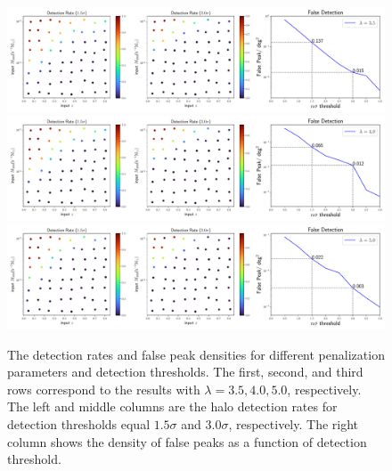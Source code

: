 \begin{figure}
 \centering
 \includegraphics[width=1.0\textwidth]{detfalse_threshold_NFW_lbd35.pdf}
 \includegraphics[width=1.0\textwidth]{detfalse_threshold_NFW_lbd40.pdf}
 \includegraphics[width=1.0\textwidth]{detfalse_threshold_NFW_lbd50.pdf}
 \caption{The detection rates and false peak densities for different
     penalization parameters and detection thresholds. The first, second, and
     third rows correspond to the results with $\lambda=3.5,4.0,5.0$,
     respectively. The left and middle columns are the halo detection rates for
     detection thresholds equal $1.5\sigma$ and $3.0\sigma$, respectively. The
     right column shows the density of false peaks as a function of detection
     threshold.
    } \label{fig_detFalsRateNFW}
\end{figure}

